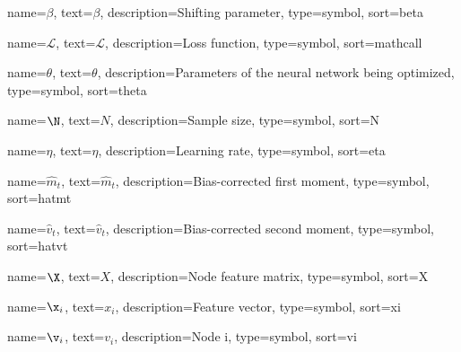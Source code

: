 {
  name={$\beta$},
  text={\ensuremath{\beta}},
  description={Shifting parameter},
  type=symbol,
  sort=beta
}

{
  name={$\mathcal{L}$},
  text={\ensuremath{\mathcal{L}}},
  description={Loss function},
  type=symbol,
  sort=mathcall
}

{
  name={$\theta$},
  text={\ensuremath{\theta}},
  description={Parameters of the neural network being optimized},
  type=symbol,
  sort=theta
}

{
  name={$\N$},
  text={\ensuremath{N}},
  description={Sample size},
  type=symbol,
  sort=N
}

{
  name={$\eta$},
  text={\ensuremath{\eta}},
  description={Learning rate},
  type=symbol,
  sort=eta
}


{
  name={$\hat{m}_t$},
  text={\ensuremath{\hat{m}_t}},
  description={Bias-corrected first moment},
  type=symbol,
  sort=hatmt
}


{
  name={$\hat{v}_t$},
  text={\ensuremath{\hat{v}_t}},
  description={Bias-corrected second moment},
  type=symbol,
  sort=hatvt
}


{
  name={$\X$},
  text={\ensuremath{X}},
  description={Node feature matrix},
  type=symbol,
  sort=X
}

{
  name={$\x_i$},
  text={\ensuremath{x_i}},
  description={Feature vector},
  type=symbol,
  sort=xi
}

{
  name={$\v_i$},
  text={\ensuremath{v_i}},
  description={Node i},
  type=symbol,
  sort=vi
}


